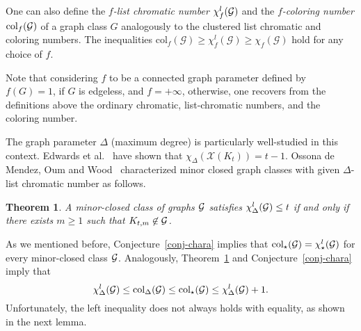 \documentclass[12pt]{article}
\newcommand{\GG}{{\cal G}}
\newtheorem{theorem}{Theorem}
\newcommand{\col}{\text{col}}
\newcommand{\mc}[1]{\mathcal{#1}}
\begin{document}
One can also define the \emph{$f$-list chromatic number} $\chi^l_{f}(\GG)$  and the \emph{$f$-coloring number} $\col_{f}(\GG)$  of a graph class $G$ analogously to the clustered list chromatic and coloring numbers. The inequalities $\col_f(\mc{G})  \geq \chi^l_f(\mc{G}) \geq \chi_f(\mc{G})$ hold for any choice of $f$. 

Note that considering $f$ to be a connected graph parameter defined by $f(G)=1$, if $G$ is edgeless, and $f= +\infty$, otherwise,  one recovers from the definitions above the ordinary chromatic, list-chromatic numbers, and the coloring number.

The graph parameter $\Delta$ (maximum degree) is particularly well-studied in this context.  Edwards et al.~\cite{EKKOS15} have shown that $\chi_\Delta(\mc{X}(K_t))=t-1$. Ossona de Mendez, Oum and Wood~\cite{OOW16} characterized minor closed graph classes with given $\Delta$-list chromatic number as follows.

\begin{theorem}\label{thm-Deltalist}
	A minor-closed class of graphs $\GG$ satisfies $\chi^l_\Delta(\GG)\le t$ if and only if there exists $m\ge 1$ such that
	$K_{t,m}\not\in \GG$.
\end{theorem}

As we mentioned before, Conjecture~\ref{conj-chara} implies that $\col_\star(\GG)= \chi^l_\star(\GG)$ for every minor-closed class $\GG$.
Analogously, Theorem~\ref{thm-Deltalist} and Conjecture~\ref{conj-chara} imply that
$$\chi^l_\Delta(\GG) \leq \col_\Delta(\GG)\leq \col_\star(\GG) \leq \chi^l_\Delta(\GG) +1.$$ 
Unfortunately, the left inequality does not always holds with equality, as shown in the next lemma.
\end{document}
